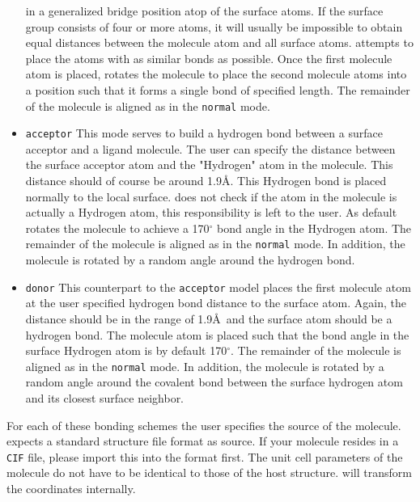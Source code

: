 \begin{itemize}
      in a generalized bridge position atop of the surface atoms. 
      If the surface group consists of four or more atoms, it will
      usually be impossible to obtain equal distances between the 
      molecule atom and all surface atoms. \Discus attempts to 
      place the atoms with as similar bonds as possible. Once the
      first molecule atom is placed, \Discus rotates the molecule
      to place the second molecule atoms into a position such 
      that it forms a single bond of specified length.
      The remainder of the molecule is 
      aligned as in the {\tt normal} mode.
\item {\tt acceptor} This mode serves to build a hydrogen bond 
      between a surface acceptor and a ligand molecule. 
      The user can specify the distance between the 
      surface acceptor atom and the "Hydrogen" atom in the molecule.
      This distance should of course be around 1.9\AA. This
      Hydrogen bond is placed normally to the local surface. \Discus 
      does not check if the atom in the molecule is actually a 
      Hydrogen atom, this responsibility is left to the user.
      As default \Discus rotates the molecule to achieve a 170$^\circ$
      bond angle in the Hydrogen atom.
      The remainder of the molecule is 
      aligned as in the {\tt normal} mode. In addition, the molecule
      is rotated by a random angle around the hydrogen bond.
\item {\tt donor} This counterpart to the {\tt acceptor} model 
      places the first molecule atom at the user specified hydrogen
      bond distance to the surface atom. Again, the distance should 
      be in the range of 1.9\AA\  and the surface atom should be a 
      hydrogen bond. The molecule atom is placed such that the 
      bond angle in the surface Hydrogen atom is by default
      170$^\circ$.
      The remainder of the molecule is 
      aligned as in the {\tt normal} mode. In addition, the molecule
      is rotated by a random angle around the covalent bond between 
      the surface hydrogen atom and its closest surface neighbor.
\end{itemize}

For each of these bonding schemes the user specifies the source of
the molecule. \Discus expects a standard structure file format as 
source. If your molecule resides in a {\tt CIF} file, please 
import this into the \Discus format first. The unit cell parameters
of the molecule do not have to be identical to those of the host
structure. \Discus will transform the coordinates internally.


